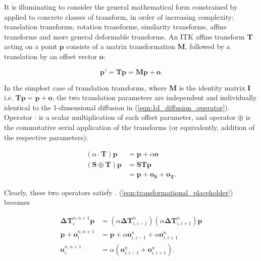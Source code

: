 	  It is illuminating to consider the general mathematical form constrained by  applied to concrete classes of transform, in order of increasing complexity: translation transforms, rotation transforms, similarity transforms, affine transforms and more general deformable transforms. An ITK affine transform $\mathbf{T}$ acting on a point $\mathbf{p}$ consists of a matrix transformation $\mathbf{M}$, followed by a translation by an offset vector $\mathbf{o}$:
		
		\begin{equation}
			\mathbf{p'} = \mathbf{Tp}= \mathbf{Mp} + \mathbf{o}.
		\end{equation}
		
		In the simplest case of translation transforms, where $\mathbf{M}$ is the identity matrix $\mathbf{I}$ i.e. $\mathbf{Tp} = \mathbf{p} + \mathbf{o}$, the two translation parameters are independent and individually identical to the 1-dimensional diffusion in (\ref{eqn:1d_diffusion_operator}). Operator $\cdot$ is a scalar multiplication of each offset parameter, and operator $\oplus$ is the commutative serial application of the transforms (or equivalently, addition of the respective parameters):
		
		\begin{align}
			(\alpha \cdot \mathbf{T}) \mathbf{p} &= \mathbf{p} + \alpha\mathbf{o} \label{eqn:translation_cdot}\\
			(\mathbf{S} \oplus \mathbf{T}) \mathbf{p} &= \mathbf{STp} \\
			                                          &= \mathbf{p} + \mathbf{o_S} + \mathbf{o_T} \label{eqn:translation_oplus}.
		\end{align}
		
		Clearly, these two operators satisfy . (\ref{eqn:transformational_placeholder}) becomes
		
		\begin{align}
		 	\mathbf{\Delta T}_i^{n,n+1} \mathbf{p} &= (\alpha \mathbf{\Delta T}_{i,i-1}^n) (\alpha \mathbf{\Delta T}_{i,i+1}^n) \mathbf{p} \\
			\mathbf{p} + \mathbf{o}_i^{n,n+1} &= \mathbf{p} + \alpha \mathbf{o}_{i,i-1}^n + \alpha \mathbf{o}_{i,i+1}^n \\
			\mathbf{o}_i^{n,n+1} &= \alpha (\mathbf{o}_{i,i-1}^n + \mathbf{o}_{i,i+1}^n).
		\end{align}
		

